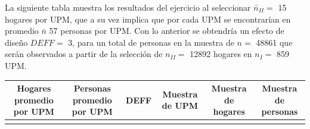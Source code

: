 La siguiente tabla muestra los resultados del ejercicio al seleccionar \(\bar{n}_{II} =\) 15 hogares por UPM, que a su vez implica que por cada UPM se encontrarían en promedio \(\bar{n}\) 57 personas por UPM. Con lo anterior se obtendría un efecto de diseño \(DEFF =\) 3, para un total de personas en la muestra de \(n =\) 48861 que serán observados a partir de la selección de \(n_{II} =\) 12892 hogares en \(n_{I} =\) 859 UPM.

\begin{longtable}[]{@{}cccccc@{}}
\toprule
\begin{minipage}[b]{0.16\columnwidth}\centering
Hogares promedio por UPM\strut
\end{minipage} & \begin{minipage}[b]{0.19\columnwidth}\centering
Personas promedio por UPM\strut
\end{minipage} & \begin{minipage}[b]{0.09\columnwidth}\centering
DEFF\strut
\end{minipage} & \begin{minipage}[b]{0.13\columnwidth}\centering
Muestra de UPM\strut
\end{minipage} & \begin{minipage}[b]{0.13\columnwidth}\centering
Muestra de hogares\strut
\end{minipage} & \begin{minipage}[b]{0.13\columnwidth}\centering
Muestra de personas\strut
\end{minipage}\tabularnewline
\midrule
\endhead
\begin{minipage}[t]{0.16\columnwidth}\centering
15\strut
\end{minipage} & \begin{minipage}[t]{0.19\columnwidth}\centering
57\strut
\end{minipage} & \begin{minipage}[t]{0.09\columnwidth}\centering
3\strut
\end{minipage} & \begin{minipage}[t]{0.13\columnwidth}\centering
859\strut
\end{minipage} & \begin{minipage}[t]{0.13\columnwidth}\centering
12892\strut
\end{minipage} & \begin{minipage}[t]{0.13\columnwidth}\centering
48861\strut
\end{minipage}\tabularnewline
\bottomrule
\end{longtable}

